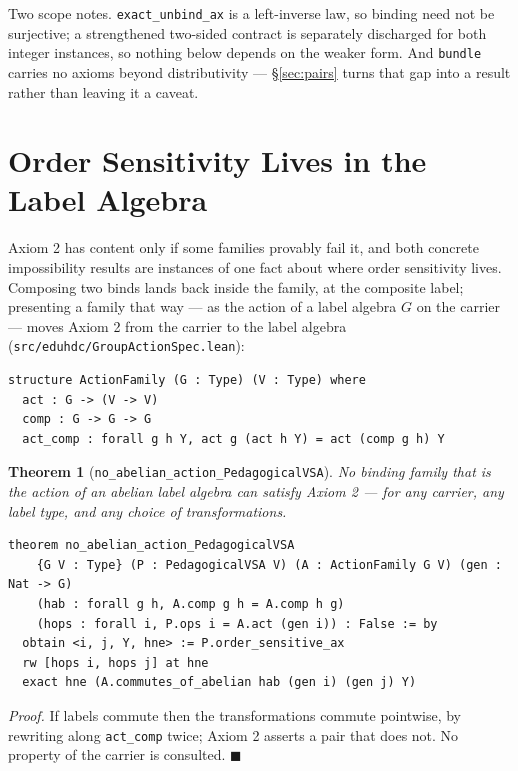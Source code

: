 \documentclass[10pt]{article}
\newtheorem{theorem}{Theorem}[section]
\begin{document}
Two scope notes. \texttt{exact\_unbind\_ax} is a left-inverse law, so binding need not be surjective; a strengthened two-sided contract is separately discharged for both integer instances, so nothing below depends on the weaker form. And \texttt{bundle} carries no axioms beyond distributivity --- \S\ref{sec:pairs} turns that gap into a result rather than leaving it a caveat.

\section{Order Sensitivity Lives in the Label Algebra}
\label{sec:criterion}

Axiom 2 has content only if some families provably fail it, and both concrete impossibility results are instances of one fact about where order sensitivity lives. Composing two binds lands back inside the family, at the composite label; presenting a family that way --- as the action of a label algebra $G$ on the carrier --- moves Axiom 2 from the carrier to the label algebra (\texttt{src/eduhdc/\allowbreak GroupActionSpec.lean}):

\begin{lstlisting}
structure ActionFamily (G : Type) (V : Type) where
  act : G -> (V -> V)
  comp : G -> G -> G
  act_comp : forall g h Y, act g (act h Y) = act (comp g h) Y
\end{lstlisting}

\begin{theorem}[\texttt{no\_abelian\_action\_PedagogicalVSA}]
\label{thm:abelian}
No binding family that is the action of an \emph{abelian} label algebra can satisfy Axiom 2 --- for any carrier, any label type, and any choice of transformations.
\end{theorem}

\begin{lstlisting}
theorem no_abelian_action_PedagogicalVSA
    {G V : Type} (P : PedagogicalVSA V) (A : ActionFamily G V) (gen : Nat -> G)
    (hab : forall g h, A.comp g h = A.comp h g)
    (hops : forall i, P.ops i = A.act (gen i)) : False := by
  obtain <i, j, Y, hne> := P.order_sensitive_ax
  rw [hops i, hops j] at hne
  exact hne (A.commutes_of_abelian hab (gen i) (gen j) Y)
\end{lstlisting}

\emph{Proof.} If labels commute then the transformations commute pointwise, by rewriting along \texttt{act\_comp} twice; Axiom 2 asserts a pair that does not. No property of the carrier is consulted. $\blacksquare$
\end{document}
